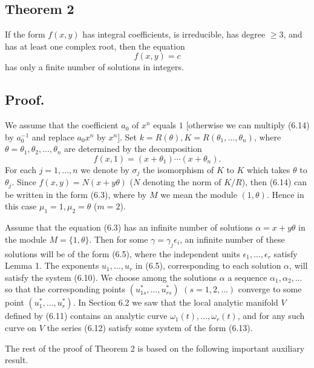 \documentclass{article}
\begin{document}
\subsection*{Theorem 2}
If the form $f(x, y)$ has integral coefficients, is irreducible, has degree $\geq 3$, and has at least one complex root, 
then the equation
\begin{equation}
f(x, y) = c
\end{equation}
has only a finite number of solutions in integers.

\subsection*{Proof.}
We assume that the coefficient $a_0$ of $x^n$ equals $1$ [otherwise we can multiply (6.14) by $a_0^{-1}$ and replace 
$a_0 x^n$ by $x^n$]. Set $k = R(\theta), K = R(\theta_1, \ldots, \theta_n)$, where $\theta = \theta_1, \theta_2, \ldots, 
\theta_n$ are determined by the decomposition
\begin{equation}
f(x, 1) = (x + \theta_1) \cdots (x + \theta_n).
\end{equation}
For each $j = 1, \ldots, n$ we denote by $\sigma_j$ the isomorphism of $K$ to $K$ which takes $\theta$ to $\theta_j$. 
Since $f(x, y) = N(x + y \theta)$ ($N$ denoting the norm of $K / R$), then (6.14) can be written in the form (6.3), where 
by $M$ we mean the module $(1, \theta)$. Hence in this case $\mu_1 = 1, \mu_2 = \theta$ ($m = 2$).

Assume that the equation (6.3) has an infinite number of solutions $\alpha = x + y \theta$ in the module $M = \{1, \theta\}$. 
Then for some $\gamma = \gamma_j \epsilon_i$, an infinite number of these solutions will be of the form (6.5), where the 
independent units $\epsilon_1, \ldots, \epsilon_r$ satisfy Lemma 1. The exponents $u_1, \ldots, u_r$ in (6.5), corresponding 
to each solution $\alpha$, will satisfy the system (6.10). We choose among the solutions $\alpha$ a sequence 
$\alpha_1, \alpha_2, \ldots$ so that the corresponding points $(u_{1s}^*, \ldots, u_{rs}^*)$ $(s = 1, 2, \ldots)$ 
converge to some point $(u_1^*, \ldots, u_r^*)$. In Section 6.2 we saw that the local analytic manifold $V$ defined by 
(6.11) contains an analytic curve $\omega_1(t), \ldots, \omega_r(t)$, and for any such curve on $V$ the series (6.12) 
satisfy some system of the form (6.13).

The rest of the proof of Theorem 2 is based on the following important auxiliary result.
\end{document}
